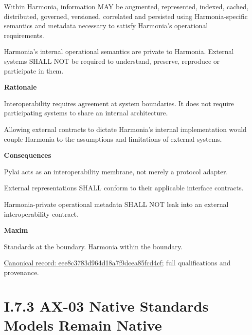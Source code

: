 Within Harmonia, information MAY be augmented, represented, indexed,
cached, distributed, governed, versioned, correlated and persisted using
Harmonia-specific semantics and metadata necessary to satisfy Harmonia's
operational requirements.



Harmonia's internal operational semantics are private to Harmonia.
External systems SHALL NOT be required to understand, preserve,
reproduce or participate in them.



\par\medskip\textbf{Rationale}\par


Interoperability requires agreement at system boundaries. It does not
require participating systems to share an internal architecture.



Allowing external contracts to dictate Harmonia's internal
implementation would couple Harmonia to the assumptions and limitations
of external systems.



\par\medskip\textbf{Consequences}\par


Pylai acts as an interoperability membrane, not merely a protocol
adapter.



External representations SHALL conform to their applicable interface
contracts.



Harmonia-private operational metadata SHALL NOT leak into an external
interoperability contract.



\par\medskip\textbf{Maxim}\par


Standards at the boundary. Harmonia within the boundary.


{\footnotesize \href{../../../../continuum/motivation/principle/eee8c3783d964d18a7f9dcea85fcd4cf.md}{Canonical record: eee8c3783d964d18a7f9dcea85fcd4cf}; full qualifications and provenance.}\par
\section*{I.7.3 AX-03 Native Standards Models Remain Native}
\label{navigation:I.7.3}

